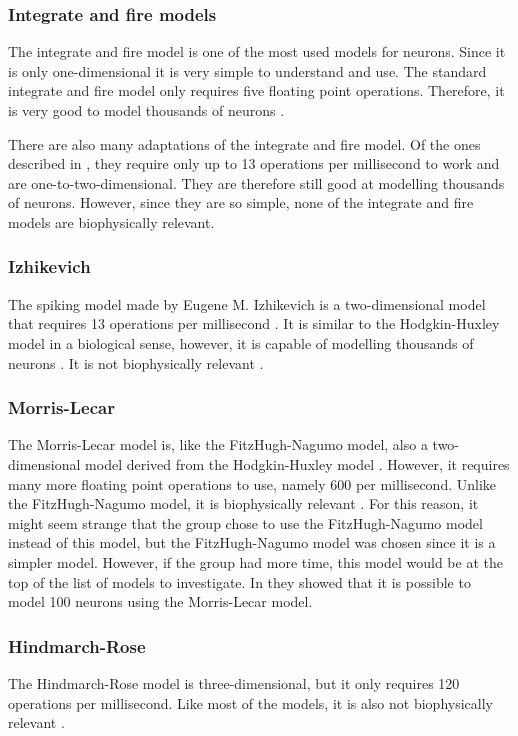 \documentclass[class={myRUCProject}, crop=false]{standalone}
\begin{document}
\subsubsection*{Integrate and fire models}
The integrate and fire model is one of the most used models for neurons. Since it is only one-dimensional it is very simple to understand and use. The standard integrate and fire model only requires five floating point operations. Therefore, it is very good to model thousands of neurons \cite{Izhikevich2004}.

There are also many adaptations of the integrate and fire model. Of the ones described in \cite{Izhikevich2004}, they require only up to 13 operations per millisecond to work and are one-to-two-dimensional. They are therefore still good at modelling thousands of neurons. However, since they are so simple, none of the integrate and fire models are biophysically relevant.

\subsubsection*{Izhikevich}
The spiking model made by Eugene M. Izhikevich is a two-dimensional model that requires 13 operations per millisecond \cite{Izhikevich2004}. It is similar to the Hodgkin-Huxley model in a biological sense, however, it is capable of modelling thousands of neurons \cite{Muni2022}. It is not biophysically relevant \cite{Izhikevich2004}.

\subsubsection*{Morris-Lecar}
The Morris-Lecar model is, like the FitzHugh-Nagumo model, also a two-dimensional model derived from the Hodgkin-Huxley model \cite{Baladron2012}. However, it requires many more floating point operations to use, namely 600 per millisecond. Unlike the FitzHugh-Nagumo model, it is biophysically relevant \cite{Izhikevich2004}. For this reason, it might seem strange that the group chose to use the FitzHugh-Nagumo model instead of this model, but the FitzHugh-Nagumo model was chosen since it is a simpler model. However, if the group had more time, this model would be at the top of the list of models to investigate. In \cite{kasatkin2015transient} they showed that it is possible to model 100 neurons using the Morris-Lecar model.


\subsubsection*{Hindmarch-Rose}
The Hindmarch-Rose model is three-dimensional, but it only requires 120 operations per millisecond. Like most of the models, it is also not biophysically relevant \cite{Izhikevich2004}.
\end{document}
